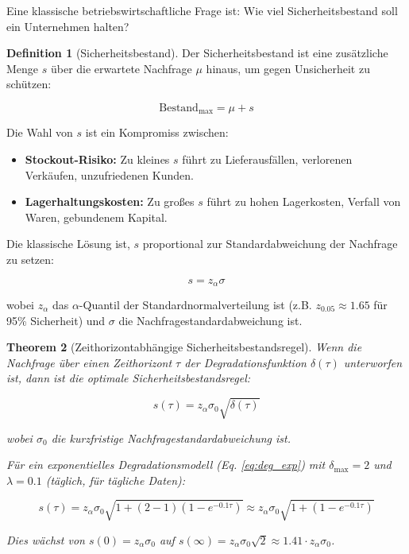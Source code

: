 \documentclass[12pt, a4paper, titlepage]{report}
\newtheorem{theorem}{Theorem}[section]
\theoremstyle{definition}
\newtheorem{definition}[theorem]{Definition}
\theoremstyle{remark}
\begin{document}
Eine klassische betriebswirtschaftliche Frage ist: Wie viel Sicherheitsbestand soll ein Unternehmen halten?

\begin{definition}[Sicherheitsbestand]
Der Sicherheitsbestand ist eine zusätzliche Menge $s$ über die erwartete Nachfrage $\mu$ hinaus, um gegen Unsicherheit zu schützen:

\begin{equation}
\text{Bestand}_{\max} = \mu + s
\label{eq:safety_stock}
\end{equation}

Die Wahl von $s$ ist ein Kompromiss zwischen:
\begin{itemize}
  \item \textbf{Stockout-Risiko:} Zu kleines $s$ führt zu Lieferausfällen, verlorenen Verkäufen, unzufriedenen Kunden.
  \item \textbf{Lagerhaltungskosten:} Zu großes $s$ führt zu hohen Lagerkosten, Verfall von Waren, gebundenem Kapital.
\end{itemize}
\end{definition}

Die klassische Lösung ist, $s$ proportional zur Standardabweichung der Nachfrage zu setzen:

\begin{equation}
s = z_\alpha \sigma
\label{eq:classical_safety}
\end{equation}

wobei $z_\alpha$ das $\alpha$-Quantil der Standardnormalverteilung ist (z.B. $z_{0.05} \approx 1.65$ für 95\% Sicherheit) und $\sigma$ die Nachfragestandardabweichung ist.

\begin{theorem}[Zeithorizontabhängige Sicherheitsbestandsregel]
\label{thm:safety_stock_degradation}
Wenn die Nachfrage über einen Zeithorizont $\tau$ der Degradationsfunktion $\delta(\tau)$ unterworfen ist, dann ist die optimale Sicherheitsbestandsregel:

\begin{equation}
s(\tau) = z_\alpha \sigma_0 \sqrt{\delta(\tau)}
\label{eq:degradation_safety}
\end{equation}

wobei $\sigma_0$ die kurzfristige Nachfragestandardabweichung ist.

Für ein exponentielles Degradationsmodell (Eq. \ref{eq:deg_exp}) mit $\delta_{\max} = 2$ und $\lambda = 0.1$ (täglich, für tägliche Daten):

\begin{equation}
s(\tau) = z_\alpha \sigma_0 \sqrt{1 + (2-1)(1 - e^{-0.1\tau})} \approx z_\alpha \sigma_0 \sqrt{1 + (1-e^{-0.1\tau})}
\label{eq:safety_example}
\end{equation}

Dies wächst von $s(0) = z_\alpha \sigma_0$ auf $s(\infty) = z_\alpha \sigma_0 \sqrt{2} \approx 1.41 \cdot z_\alpha \sigma_0$.
\end{theorem}
\end{document}
